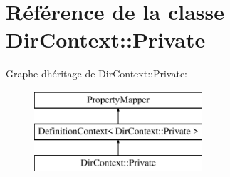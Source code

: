 \hypertarget{class_dir_context_1_1_private}{}\section{Référence de la classe Dir\+Context\+:\+:Private}
\label{class_dir_context_1_1_private}
Graphe d\textquotesingle{}héritage de Dir\+Context\+:\+:Private\+:\begin{figure}[H]
\begin{center}
\leavevmode
\includegraphics[height=3.000000cm]{class_dir_context_1_1_private}
\end{center}
\end{figure}

